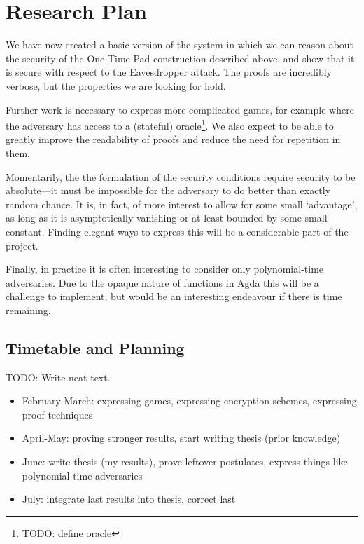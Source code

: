 \chapter{Research Plan}


We have now created a basic version of the system in which we can reason about the security of the One-Time Pad
construction described above, and show that it is secure with respect to the Eavesdropper attack.  The proofs are
incredibly verbose, but the properties we are looking for hold.  

Further work is necessary to express more complicated games, for example where the adversary has access to a
(stateful) oracle\footnote{TODO: define oracle}.  We also expect to be able to greatly improve the readability of
proofs and reduce the need for repetition in them.

Momentarily, the the formulation of the security conditions require security to be absolute---it must be impossible
for the adversary to do better than exactly random chance.  It is, in fact, of more interest to allow for some small
`advantage', as long as it is asymptotically vanishing or at least bounded by some small constant.  Finding elegant
ways to express this will be a considerable part of the project.

Finally, in practice it is often interesting to consider only polynomial-time adversaries.  Due to the opaque nature
of functions in Agda this will be a challenge to implement, but would be an interesting endeavour if there is
time remaining.

\section{Timetable and Planning}

TODO: Write neat text.
\begin{itemize}
    \itemsep0em
    \item February-March: expressing games, expressing encryption schemes, expressing proof techniques
    \item April-May: proving stronger results, start writing thesis (prior knowledge)
    \item June: write thesis (my results), prove leftover postulates, express things like polynomial-time adversaries
    \item July: integrate last results into thesis, correct last
\end{itemize}

